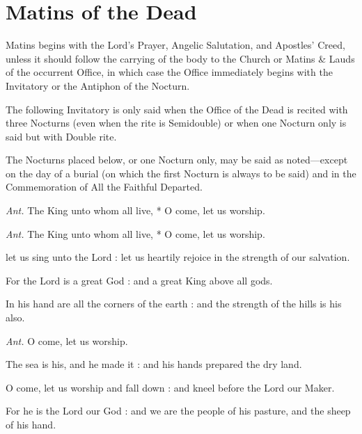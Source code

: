\section{Matins of the Dead}
\begin{rubric}
Matins begins with the Lord's Prayer, Angelic Salutation, and Apostles' Creed, unless it should follow the carrying of the body to the Church or Matins \& Lauds of the occurrent Office, in which case the Office immediately begins with the Invitatory or the Antiphon of the Nocturn.
\end{rubric}
\begin{rubric}
    The following Invitatory is only said when the Office of the Dead is recited with three Nocturns (even when the rite is Semidouble) or when one Nocturn only is said but with Double rite.
\end{rubric}
\begin{rubric}
    The Nocturns placed below, or one Nocturn only, may be said as noted---except on the day of a burial (on which the first Nocturn is always to be said) and in the Commemoration of All the Faithful Departed.%
\end{rubric}
\par\noindent
\textit{Ant.} The King unto whom all live, * O come, let us worship.\par
\textit{Ant.} The King unto whom all live, * O come, let us worship.\par
{} let us sing unto the Lord : let us heartily rejoice in the strength of our salvation.\par
{}
For the Lord is a great God : and a great King above all gods.\par
{}In his hand are all the corners of the earth : and the strength of the hills is his also.\par
\textit{Ant.} O come, let us worship.\par
{}The sea is his, and he made it : and his hands prepared the dry land.\par
{}O come, let us worship and fall down : and kneel before the Lord our Maker.\par
{}For he is the Lord our God : and we are the people of his pasture, and the sheep of his hand.\par
